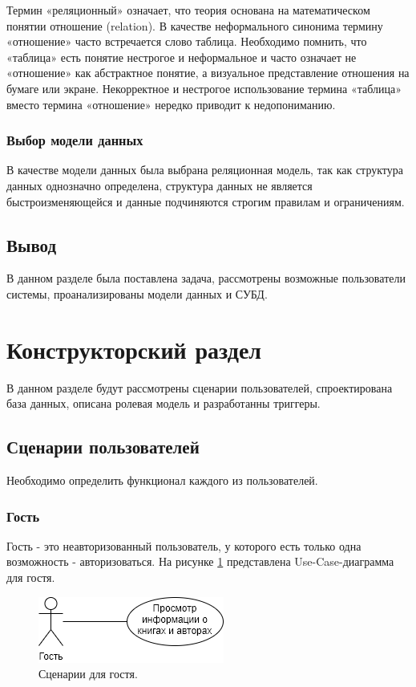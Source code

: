 Термин «реляционный» означает, что теория основана на математическом понятии отношение (relation). В качестве неформального синонима термину «отношение» часто встречается слово таблица. Необходимо помнить, что «таблица» есть понятие нестрогое и неформальное и часто означает не «отношение» как абстрактное понятие, а визуальное представление отношения на бумаге или экране. Некорректное и нестрогое использование термина «таблица» вместо термина «отношение» нередко приводит к недопониманию.

\subsubsection{Выбор модели данных}
В качестве модели данных была выбрана реляционная модель, так как структура данных однозначно определена, структура данных не является быстроизменяющейся и данные подчиняются строгим правилам и ограничениям.

\subsection{Вывод}
В данном разделе была поставлена задача, рассмотрены возможные пользователи системы, проанализированы модели данных и СУБД.


\clearpage
\section{Конструкторский раздел}
В данном разделе будут рассмотрены сценарии пользователей, спроектирована база данных, описана ролевая модель и разработанны триггеры.
\subsection{Сценарии пользователей}
Необходимо определить функционал каждого из пользователей. 
\subsubsection{Гость}
Гость - это неавторизованный пользователь, у которого есть только одна возможность - авторизоваться. На рисунке \ref{img:UseCaseGuest} представлена Use-Case-диаграмма для гостя.

\begin{figure}[h!]
	\centering
	\includegraphics[scale=1]{img/UseCaseGuest.png}
	\caption{Сценарии для гостя.}
	\label{img:UseCaseGuest}
\end{figure}
\clearpage

